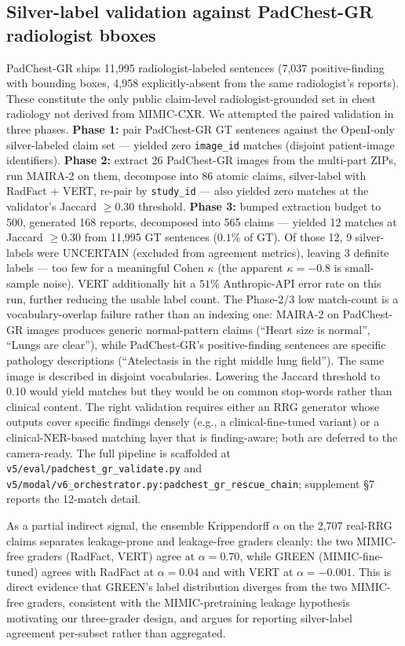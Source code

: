 \documentclass[pmlr]{jmlr}
\begin{document}
\subsection{Silver-label validation against PadChest-GR radiologist bboxes}
\label{sec:silver-validation}

PadChest-GR ships 11{,}995 radiologist-labeled sentences (7{,}037 positive-finding with bounding boxes, 4{,}958 explicitly-absent from the same radiologist's reports). These constitute the only public claim-level radiologist-grounded set in chest radiology not derived from MIMIC-CXR. We attempted the paired validation in three phases. \textbf{Phase 1:} pair PadChest-GR GT sentences against the OpenI-only silver-labeled claim set — yielded zero \texttt{image\_id} matches (disjoint patient-image identifiers). \textbf{Phase 2:} extract 26 PadChest-GR images from the multi-part ZIPs, run MAIRA-2 on them, decompose into 86 atomic claims, silver-label with RadFact + VERT, re-pair by \texttt{study\_id} — also yielded zero matches at the validator's Jaccard $\geq 0.30$ threshold. \textbf{Phase 3:} bumped extraction budget to 500, generated 168 reports, decomposed into 565 claims — yielded 12 matches at Jaccard $\geq 0.30$ from 11{,}995 GT sentences ($0.1\%$ of GT). Of those 12, 9 silver-labels were \textsc{UNCERTAIN} (excluded from agreement metrics), leaving 3 definite labels — too few for a meaningful Cohen $\kappa$ (the apparent $\kappa = -0.8$ is small-sample noise). VERT additionally hit a $51\%$ Anthropic-API error rate on this run, further reducing the usable label count. The Phase-2/3 low match-count is a vocabulary-overlap failure rather than an indexing one: MAIRA-2 on PadChest-GR images produces generic normal-pattern claims (``Heart size is normal'', ``Lungs are clear''), while PadChest-GR's positive-finding sentences are specific pathology descriptions (``Atelectasis in the right middle lung field''). The same image is described in disjoint vocabularies. Lowering the Jaccard threshold to 0.10 would yield matches but they would be on common stop-words rather than clinical content. The right validation requires either an RRG generator whose outputs cover specific findings densely (e.g., a clinical-fine-tuned variant) or a clinical-NER-based matching layer that is finding-aware; both are deferred to the camera-ready. The full pipeline is scaffolded at \texttt{v5/eval/padchest\_gr\_validate.py} and \texttt{v5/modal/v6\_orchestrator.py:padchest\_gr\_rescue\_chain}; supplement §7 reports the 12-match detail.

As a partial indirect signal, the ensemble Krippendorff $\alpha$ on the 2{,}707 real-RRG claims separates leakage-prone and leakage-free graders cleanly: the two MIMIC-free graders (RadFact, VERT) agree at $\alpha = 0.70$, while GREEN (MIMIC-fine-tuned) agrees with RadFact at $\alpha = 0.04$ and with VERT at $\alpha = -0.001$. This is direct evidence that GREEN's label distribution diverges from the two MIMIC-free graders, consistent with the MIMIC-pretraining leakage hypothesis motivating our three-grader design, and argues for reporting silver-label agreement per-subset rather than aggregated.
\end{document}
